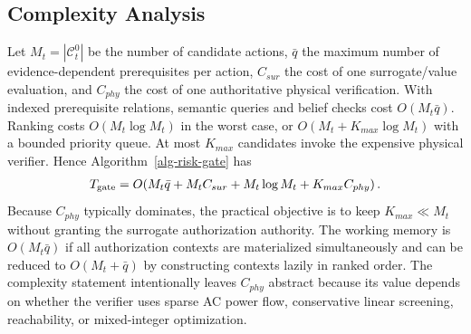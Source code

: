 \subsection{Complexity Analysis}
Let $M_t=|\mathcal{C}_t^{0}|$ be the number of candidate actions, $\bar q$ the maximum number of evidence-dependent prerequisites per action, $C_{sur}$ the cost of one surrogate/value evaluation, and $C_{phy}$ the cost of one authoritative physical verification. With indexed prerequisite relations, semantic queries and belief checks cost $O(M_t\bar q)$. Ranking costs $O(M_t\log M_t)$ in the worst case, or $O(M_t+K_{max}\log M_t)$ with a bounded priority queue. At most $K_{max}$ candidates invoke the expensive physical verifier. Hence Algorithm~\ref{alg-risk-gate} has
\begin{align}
\label{eq-complexity-risk-gate}
T_{\rm gate}=O\!\left(M_t\bar q+M_tC_{sur}+M_t\log M_t+K_{max}C_{phy}\right).
\end{align}
Because $C_{phy}$ typically dominates, the practical objective is to keep $K_{max}\ll M_t$ without granting the surrogate authorization authority. The working memory is $O(M_t\bar q)$ if all authorization contexts are materialized simultaneously and can be reduced to $O(M_t+\bar q)$ by constructing contexts lazily in ranked order. The complexity statement intentionally leaves $C_{phy}$ abstract because its value depends on whether the verifier uses sparse AC power flow, conservative linear screening, reachability, or mixed-integer optimization.
